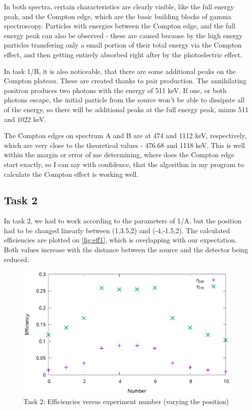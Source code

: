 \documentclass[a4paper,12pt]{article}
\begin{document}
In both spectra, certain characteristics are clearly visible, like the full energy peak, and the Compton edge, which are the basic building blocks of gamma spectroscopy. Particles with  energies between the Compton edge, and the full energy peak can also be observed - these are caused because by the high energy particles transfering only a small portion of their total energy via the Compton effect, and then getting entirely absorbed right after by the photoelectric effect.

In task 1/B, it is also noticeable, that there are some additional peaks on the Compton plateau. These are created thanks to pair production. The annihilating positron produces two photons with the energy of 511 keV. If one, or both photons escape, the initial particle from the source won't be able to dissipate all of the energy, so there will be additional peaks at the full energy peak, minus 511 and 1022 keV.

The Compton edges on spectrum A and B are at 474 and 1112 keV, respectively, which are very close to the theoretical values - 476.68 and 1118 keV. This is well within the margin or error of me determining, where does the Compton edge start exactly, so I can say with confidence, that the algorithm in my program to calculate the Compton effect is working well.

\subsection{Task 2}
In task 2, we had to work according to the parameters of 1/A, but the position had to be changed linearly between (1,3.5,2) and (-4,-1.5,2). The calculated efficiencies are plotted on \autoref{fig:eff1}, which is overlapping with our expectation. Both values increase with the distance between the source and the detector being reduced.
\begin{figure}[h!]
\centering
\includegraphics[width=\textwidth]{./2.eps}
\caption{Task 2: Efficiencies versus experiment number (varying the position)}
\label{fig:eff1}
\end{figure}
\end{document}
